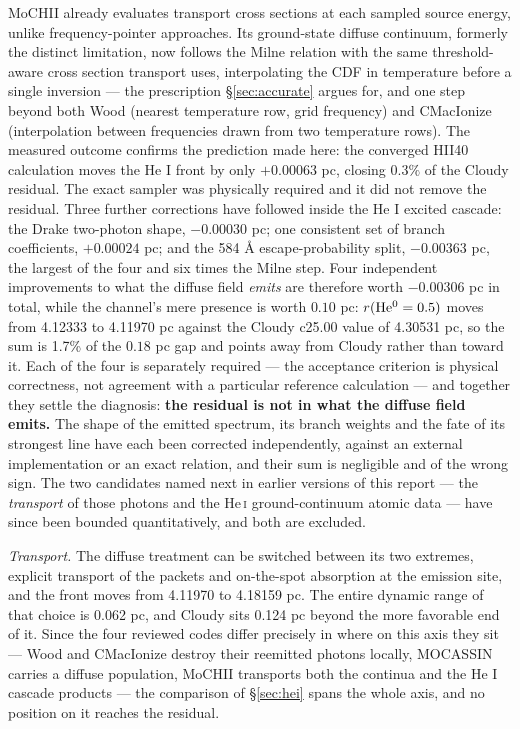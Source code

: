 \documentclass[11pt]{my_memo}
\begin{document}
MoCHII already evaluates transport cross sections at each sampled source energy, unlike frequency-pointer approaches.  Its ground-state diffuse continuum, formerly the distinct limitation, now follows the Milne relation with the same threshold-aware cross section transport uses, interpolating the CDF in temperature before a single inversion --- the prescription \S\ref{sec:accurate} argues for, and one step beyond both Wood (nearest temperature row, grid frequency) and CMacIonize (interpolation between frequencies drawn from two temperature rows).  The measured outcome confirms the prediction made here: the converged HII40 calculation moves the He I front by only $+0.00063$ pc, closing $0.3\%$ of the Cloudy residual.  The exact sampler was physically required and it did not remove the residual.  Three further corrections have followed inside the He I excited cascade: the Drake two-photon shape, $-0.00030$ pc; one consistent set of branch coefficients, $+0.00024$ pc; and the 584 \AA{} escape-probability split, $-0.00363$ pc, the largest of the four and six times the Milne step.  Four independent improvements to what the diffuse field \emph{emits} are therefore worth $-0.00306$ pc in total, while the channel's mere presence is worth $0.10$ pc: $r({\rm He^0}=0.5)$ moves from 4.12333 to 4.11970 pc against the Cloudy c25.00 value of 4.30531 pc, so the sum is 1.7\% of the $0.18$ pc gap and points away from Cloudy rather than toward it.  Each of the four is separately required --- the acceptance criterion is physical correctness, not agreement with a particular reference calculation --- and together they settle the diagnosis: \textbf{the residual is not in what the diffuse field emits.}  The shape of the emitted spectrum, its branch weights and the fate of its strongest line have each been corrected independently, against an external implementation or an exact relation, and their sum is negligible and of the wrong sign.  The two candidates named next in earlier versions of this report --- the \emph{transport} of those photons and the He\,\textsc{i} ground-continuum atomic data --- have since been bounded quantitatively, and both are excluded.

\emph{Transport.}  The diffuse treatment can be switched between its two extremes, explicit transport of the packets and on-the-spot absorption at the emission site, and the front moves from 4.11970 to 4.18159 pc.  The entire dynamic range of that choice is 0.062 pc, and Cloudy sits 0.124 pc beyond the more favorable end of it.  Since the four reviewed codes differ precisely in where on this axis they sit --- Wood and CMacIonize destroy their reemitted photons locally, MOCASSIN carries a diffuse population, MoCHII transports both the continua and the He I cascade products --- the comparison of \S\ref{sec:hei} spans the whole axis, and no position on it reaches the residual.
\end{document}
